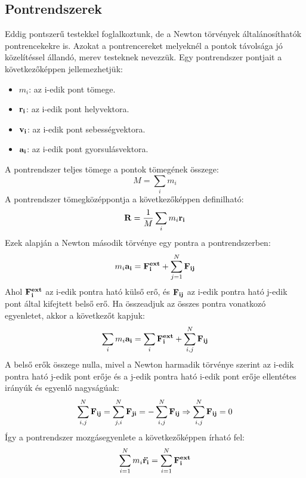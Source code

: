 \documentclass[../main.tex]{subfiles}
\begin{document}
\subsection{Pontrendszerek}
Eddig pontszerű testekkel foglalkoztunk, de a Newton törvények általánosíthatók pontrencekekre is. Azokat a pontrencereket melyeknél a pontok távolsága jó közelítéssel állandó, merev testeknek nevezzük.
Egy pontrendszer pontjait a következőképpen jellemezhetjük:
\begin{itemize}
    \item $m_i$: az i-edik pont tömege.
    \item $\bold{r_i}$: az i-edik pont helyvektora.
    \item $\bold{v_i}$: az i-edik pont sebességvektora.
    \item $\bold{a_i}$: az i-edik pont gyorsulásvektora.
\end{itemize}
A pontrendszer teljes tömege a pontok tömegének összege:
\begin{equation}
    M = \sum_{i} m_i
\end{equation}
A pontrendszer tömegközéppontja a következőképpen definilható:
\begin{equation}
    \bold{R} = \frac{1}{M} \sum_{i} m_i \bold{r_i}
\end{equation}
Ezek alapján a Newton második törvénye egy pontra a pontrendszerben:
\begin{equation}
    m_i \bold{a_i} = \bold{F_i^{ext}} + \sum_{j=1}^{N} \bold{F_{ij}}
\end{equation}
Ahol $\bold{F_i^{ext}}$ az i-edik pontra ható külső erő, és $\bold{F_{ij}}$ az i-edik pontra ható j-edik pont által kifejtett belső erő. Ha összeadjuk az összes pontra vonatkozó egyenletet, akkor a következőt kapjuk:
\begin{equation}
    \sum_{i} m_i \bold{a_i} = \sum_{i} \bold{F_i^{ext}} + \sum_{i,j}^{N} \bold{F_{ij}}
\end{equation}
A belső erők összege nulla, mivel a Newton harmadik törvénye szerint az i-edik pontra ható j-edik pont erője és a j-edik pontra ható i-edik pont erője ellentétes irányúk és egyenlő nagyságúak:
\begin{equation}
    \sum_{i,j}^{N} \bold{F_{ij}} = \sum_{j,i}^{N} \bold{F_{ji}} = -\sum_{i,j}^{N} \bold{F_{ij}} \Rightarrow \sum_{i,j}^{N} \bold{F_{ij}} = 0
\end{equation}
Így a pontrendszer mozgásegyenlete a következőképpen írható fel:
\begin{equation}
    \sum_{i=1}^{N} m_i \bold{\ddot{r_i}} = \sum_{i=1}^{N} \bold{F_i^{ext}}
\end{equation}
\end{document}
